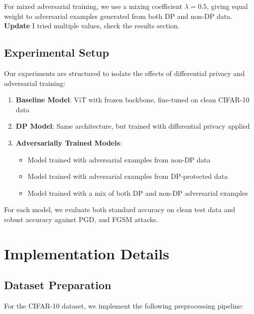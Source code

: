 \documentclass[11pt, conference]{IEEEtran}
\begin{document}
For mixed adversarial training, we use a mixing coefficient $\lambda = 0.5$, giving equal weight to adversarial examples generated from both DP and non-DP data. \textbf{Update} I tried multiple values, check the results section.

\subsection{Experimental Setup}
Our experiments are structured to isolate the effects of differential privacy and adversarial training:

\begin{enumerate}
    \item \textbf{Baseline Model}: ViT with frozen backbone, fine-tuned on clean CIFAR-10 data
    
    \item \textbf{DP Model}: Same architecture, but trained with differential privacy applied
    
    \item \textbf{Adversarially Trained Models}:
    \begin{itemize}
        \item Model trained with adversarial examples from non-DP data
        \item Model trained with adversarial examples from DP-protected data
        \item Model trained with a mix of both DP and non-DP adversarial examples
    \end{itemize}
\end{enumerate}

For each model, we evaluate both standard accuracy on clean test data and robust accuracy against PGD, and FGSM attacks.
\section{Implementation Details}

\subsection{Dataset Preparation}
For the CIFAR-10 dataset, we implement the following preprocessing pipeline:

\end{document}
